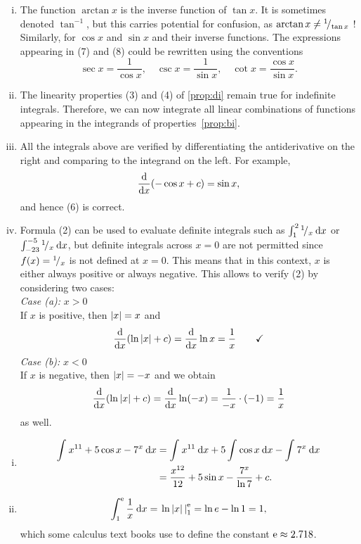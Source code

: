 \begin{remark}
\begin{enumerate}[(i)]
	\item The function $\arctan x$ is the inverse function of $\tan x$. It is sometimes denoted $\tan^{-1}$, but this carries potential for confusion, as $\arctan x \not= {}^{1}\!/_{\tan x}$ ! Similarly, for $\cos x$ and $\sin x$ and their inverse functions. The expressions appearing in (7) and (8) could be rewritten using the conventions
	\[  \sec x = \frac{1}{\cos x}, \quad \csc x = \frac{1}{\sin x}, \quad
	\cot x = \frac{\cos x}{\sin x}.\]
	\item The linearity properties (3) and (4) of \ref{prop:di} remain true for indefinite integrals. Therefore, we can now integrate all linear combinations of functions appearing in the integrands of properties~\ref{prop:bi}.
	\item All the integrals above are verified by differentiating the antiderivative on the right and comparing to the integrand on the left. For example,
	\[ \displaystyle{\frac{\mathrm{d}}{\mathrm{d}x}} (-\cos x + c) = \sin x, \]
	and hence (6) is correct.
	\item Formula (2) can be used to evaluate definite integrals such as $\int_{1}^{2} {}^{1}\!/_{x} \: \mathrm{d} x$ or $\int_{-23}^{-5} {}^{1}\!/_{x} \: \mathrm{d} x$, but definite integrals across $x=0$ are not permitted since $f(x) = {}^{1}\!/_{x}$ is not defined at $x=0$. This means that in this context, $x$ is either always positive or always negative. This allows to verify (2) by considering two cases: \\
	{\it Case (a):} $x>0$ \\
	\phantom{abc}If $x$ is positive, then $\left| x \right|=x$ and
	\[ \displaystyle{\frac{\mathrm{d}}{\mathrm{d}x}} (\ln \left| x \right| + c) = \displaystyle{\frac{\mathrm{d}}{\mathrm{d}x}} \ln x = \frac1x \qquad \text{\checkmark} \]
	{\it Case (b):} $x<0$ \\
	\phantom{abc}If $x$ is negative, then $\left| x \right|=-x$ and we obtain
	\[ \displaystyle{\frac{\mathrm{d}}{\mathrm{d}x}} (\ln \left| x \right| + c) = \displaystyle{\frac{\mathrm{d}}{\mathrm{d}x}} \ln(-x) = \frac{1}{-x}\cdot(-1) = \frac1x \]
	\phantom{abc}as well.
\end{enumerate}
\end{remark}

\begin{example}
\begin{enumerate}[(i)]
	\item
	\begin{equation*}
	\begin{split}
	\int_{}^{}  x^{11} + 5\cos x - 7^x  \: \mathrm{d} x 
	& = \int_{}^{} x^{11} \: \mathrm{d} x + 5\int_{}^{} \cos x \: \mathrm{d} x - \int_{}^{} 7^x \: \mathrm{d} x \\
	& = \frac{x^{12}}{12} + 5\sin x - \frac{7^x}{\ln 7} + c.
	\end{split} 
	\end{equation*}
	\item \[ \int_{1}^{\mathrm{e}} \frac1x \: \mathrm{d} x = \left.  \ln \left| x \right|  \, \right|_{1}^{\mathrm{e}} = \ln e - \ln 1 = 1, \]
	which some calculus text books use to define the constant $\mathrm{e}\approx2.718$.
\end{enumerate}
\end{example}

